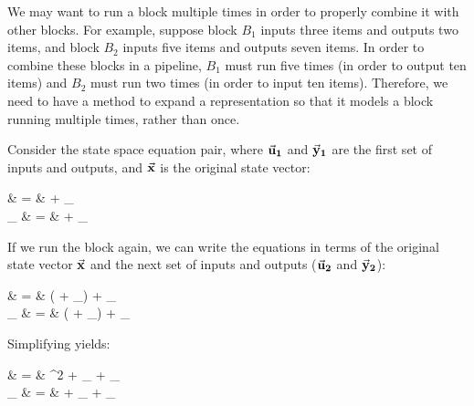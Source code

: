 \label{sec:expansion}

We may want to run a block multiple times in order to properly combine
it with other blocks. For example, suppose block $B_1$ inputs three
items and outputs two items, and block $B_2$ inputs five items and
outputs seven items. In order to combine these blocks in a pipeline,
$B_1$ must run five times (in order to output ten items) and $B_2$
must run two times (in order to input ten items). Therefore, we need
to have a method to expand a representation so that it models a block
running multiple times, rather than once.

Consider the state space equation pair, where ${\vec{\mathbf{u}}}_{\mathbf{1}}$ and
${\vec{\mathbf{y}}}_{\mathbf{1}}$ are the first set of inputs and outputs, and
$\vec{\mathbf{x}}$ is the original state vector:
\hspace{1in}\hspace{-3pt}\begin{minipage}[t]{2in}
\vspace{-15pt}
\starteqnstar
{} & = &  + _{} \\
{}_{} & = &  +
_{}
\doneeqnstar
\vspace{8pt}
\end{minipage}

If we run the block again, we can write the equations in terms of the
original state vector $\vec{\mathbf{x}}$ and the next set of
inputs and outputs (${\vec{\mathbf{u}}}_{\mathbf{2}}$ and ${\vec{\mathbf{y}}}_{\mathbf{2}}$):
\hspace{0.23in}\begin{minipage}[t]{2in}
\vspace{-15pt}
\starteqnstar
{} & = & (
+
_{}) + _{} \\
{}_{} & = & ( +
_{}) + _{}
\doneeqnstar
\vspace{16pt}
\end{minipage}

\noindent Simplifying yields:
\hspace{1.75in}\hspace{1.2pt}\begin{minipage}[t]{2in}
\vspace{-15pt}
\starteqnstar
{} & = & ^2 +
_{} + _{} \\
{}_{} & = &  +
_{} + _{}
\doneeqnstar
\vspace{8pt}
\end{minipage}

